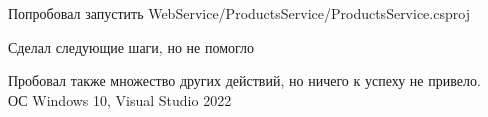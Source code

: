 \documentclass[a4paper,11pt]{article}
\begin{document}
Попробовал запустить WebService/ProductsService/ProductsService.csproj
\begin{center}
\label{fig:image}
\end{center}
Сделал следующие шаги, но не помогло
\begin{center}
\label{fig:image}
\end{center}
\begin{center}
\label{fig:image}
\end{center}
Пробовал также множество других действий, но ничего к успеху не привело.\\
ОС Windows 10, Visual Studio 2022
\end{document}
